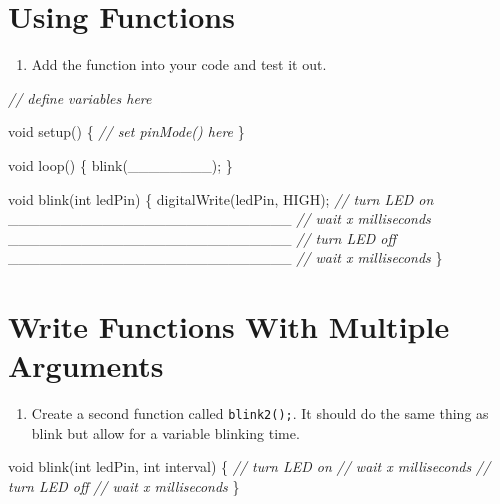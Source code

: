 \documentclass[]{book}
\newenvironment{Shaded}{\begin{snugshade}}{\end{snugshade}}
\newcommand{\CommentTok}[1]{\textcolor[rgb]{0.56,0.35,0.01}{\textit{#1}}}
\newcommand{\DataTypeTok}[1]{\textcolor[rgb]{0.13,0.29,0.53}{#1}}
\newcommand{\NormalTok}[1]{#1}
\providecommand{\tightlist}{%
  \setlength{\itemsep}{0pt}\setlength{\parskip}{0pt}}
\begin{document}
\hypertarget{using-functions-1}{%
\section{Using Functions}\label{using-functions-1}}

\begin{enumerate}
\def\labelenumi{\arabic{enumi}.}
\tightlist
\item
  Add the function into your code and test it out.
\end{enumerate}

\begin{Shaded}
\begin{Highlighting}[]
  \CommentTok{// define variables here}
  
  \DataTypeTok{void}\NormalTok{ setup() \{}
    \CommentTok{// set pinMode() here}
\NormalTok{  \}}
  
  \DataTypeTok{void}\NormalTok{ loop() \{}
\NormalTok{    blink(________);}
\NormalTok{  \}}
  
  \DataTypeTok{void}\NormalTok{ blink(}\DataTypeTok{int}\NormalTok{ ledPin) \{}
\NormalTok{    digitalWrite(ledPin, HIGH); }\CommentTok{// turn LED on}
\NormalTok{    ___________________________ }\CommentTok{// wait x milliseconds}
\NormalTok{    ___________________________ }\CommentTok{// turn LED off}
\NormalTok{    ___________________________ }\CommentTok{// wait x milliseconds}
\NormalTok{  \}}
\end{Highlighting}
\end{Shaded}

\hypertarget{write-functions-with-multiple-arguments}{%
\section{Write Functions With Multiple Arguments}\label{write-functions-with-multiple-arguments}}

\begin{enumerate}
\def\labelenumi{\arabic{enumi}.}
\tightlist
\item
  Create a second function called \texttt{blink2();}. It should do the same thing as blink but allow for a variable blinking time.
\end{enumerate}

\begin{Shaded}
\begin{Highlighting}[]
  \DataTypeTok{void}\NormalTok{ blink(}\DataTypeTok{int}\NormalTok{ ledPin, }\DataTypeTok{int}\NormalTok{ interval) \{}
    \CommentTok{// turn LED on}
    \CommentTok{// wait x milliseconds}
    \CommentTok{// turn LED off}
    \CommentTok{// wait x milliseconds}
\NormalTok{  \}}
\end{Highlighting}
\end{Shaded}
\end{document}

